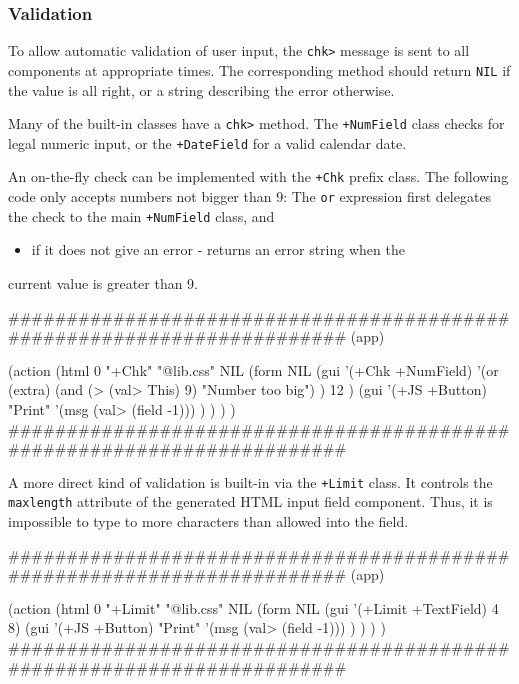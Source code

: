 \subsubsection{ Validation}
\label{sec:appl-devel-validation}%

To allow automatic validation of user input, the \texttt{chk>} message is sent
to all components at appropriate times. The corresponding method should
return \texttt{NIL} if the value is all right, or a string describing the error
otherwise.

Many of the built-in classes have a \texttt{chk>} method. The \texttt{+NumField} class
checks for legal numeric input, or the \texttt{+DateField} for a valid calendar
date.

An on-the-fly check can be implemented with the \texttt{+Chk} prefix class. The
following code only accepts numbers not bigger than 9: The \texttt{or}
expression first delegates the check to the main \texttt{+NumField} class, and
\begin{itemize}
\item if it does not give an error - returns an error string when the
\end{itemize}
current value is greater than 9.


\begin{wideverbatim}
########################################################################
(app)

(action
   (html 0 "+Chk" "@lib.css" NIL
      (form NIL
         (gui '(+Chk +NumField)
            '(or
               (extra)
               (and (> (val> This) 9) "Number too big") )
            12 )
         (gui '(+JS +Button) "Print"
            '(msg (val> (field -1))) ) ) ) )
########################################################################
\end{wideverbatim}

A more direct kind of validation is built-in via the \texttt{+Limit} class. It
controls the \texttt{maxlength} attribute of the generated HTML input field
component. Thus, it is impossible to type to more characters than
allowed into the field.


\begin{wideverbatim}
########################################################################
(app)

(action
   (html 0 "+Limit" "@lib.css" NIL
      (form NIL
         (gui '(+Limit +TextField) 4 8)
         (gui '(+JS +Button) "Print"
            '(msg (val> (field -1))) ) ) ) )
########################################################################
\end{wideverbatim}

